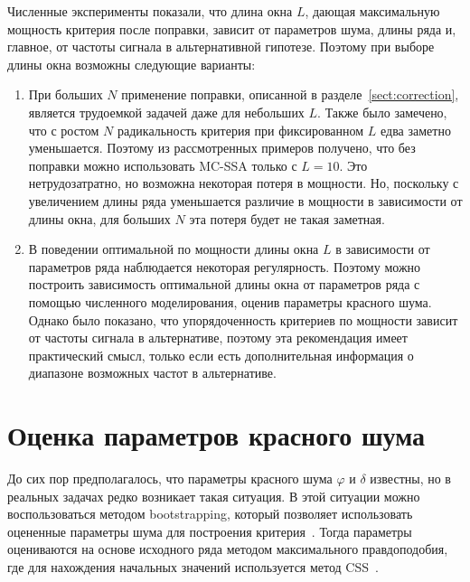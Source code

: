\documentclass[specialist,
substylefile = spbu_report.rtx,
subf,href,colorlinks=true, 12pt]{disser}
\theoremstyle{definition}
\begin{document}
Численные эксперименты показали, что длина окна $L$, дающая максимальную мощность критерия после поправки, зависит от параметров шума, длины ряда и, главное, от частоты сигнала в альтернативной гипотезе. Поэтому при выборе длины окна возможны следующие варианты:
\begin{enumerate}
	\item При больших $N$ применение поправки, описанной в разделе~\ref{sect:correction}, является трудоемкой задачей даже для небольших $L$. Также было замечено, что с ростом $N$ радикальность критерия при фиксированном $L$ едва заметно уменьшается. Поэтому из рассмотренных примеров получено, что без поправки можно использовать MC-SSA только с $L=10$. Это нетрудозатратно, но возможна некоторая потеря в мощности. Но, поскольку с увеличением длины ряда уменьшается различие в мощности в зависимости от длины окна, для больших $N$ эта потеря будет не такая заметная.
	\item В поведении оптимальной по мощности длины окна $L$ в зависимости от параметров ряда наблюдается некоторая регулярность. Поэтому можно построить зависимость оптимальной длины окна от параметров ряда с помощью численного моделирования, оценив параметры красного шума. Однако было показано, что упорядоченность критериев по мощности зависит от частоты сигнала в альтернативе, поэтому эта рекомендация имеет практический смысл, только если есть дополнительная информация о диапазоне возможных частот в альтернативе.
\end{enumerate}

\section{Оценка параметров красного шума}\label{sect:phi_est}
До сих пор предполагалось, что параметры красного шума $\varphi$ и $\delta$ известны, но в реальных задачах редко возникает такая ситуация. В этой ситуации можно воспользоваться методом bootstrapping, который позволяет использовать оцененные параметры шума для построения критерия~\cite{Golyandina_2023}. Тогда параметры оцениваются на основе исходного ряда методом максимального правдоподобия, где для нахождения начальных значений используется метод CSS~\cite{ARIMA_est}.
\end{document}
